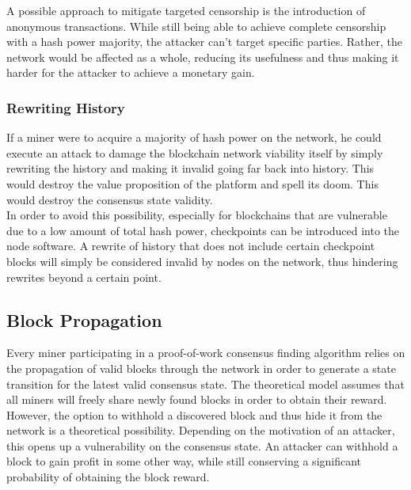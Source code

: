 \documentclass[11pt,a4paper]{article}
\begin{document}
A possible approach to mitigate targeted censorship is the introduction of anonymous transactions. While still being able to achieve complete censorship with a hash power majority, the attacker can't target specific parties. Rather, the network would be affected as a whole, reducing its usefulness and thus making it harder for the attacker to achieve a monetary gain.\\

\subsubsection{Rewriting History}

If a miner were to acquire a majority of hash power on the network, he could execute an attack to damage the blockchain network viability itself by simply rewriting the history and making it invalid going far back into history. This would destroy the value proposition of the platform and spell its doom. This would destroy the consensus state validity.\\

In order to avoid this possibility, especially for blockchains that are vulnerable due to a low amount of total hash power, checkpoints can be introduced into the node software. A rewrite of history that does not include certain checkpoint blocks will simply be considered invalid by nodes on the network, thus hindering rewrites beyond a certain point.\\

\subsection{Block Propagation}

Every miner participating in a proof-of-work consensus finding algorithm relies on the propagation of valid blocks through the network in order to generate a state transition for the latest valid consensus state. The theoretical model assumes that all miners will freely share newly found blocks in order to obtain their reward.\\

However, the option to withhold a discovered block and thus hide it from the network is a theoretical possibility. Depending on the motivation of an attacker, this opens up a vulnerability on the consensus state. An attacker can withhold a block to gain profit in some other way, while still conserving a significant probability of obtaining the block reward.\\
\end{document}
